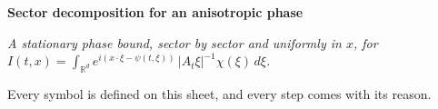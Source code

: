 \documentclass[10pt]{article}
\newcommand{\R}{\mathbb{R}}
\begin{document}
\begin{center}
{\fontsize{44}{52}\selectfont\bfseries\color{cNavy}Sector decomposition for an anisotropic phase\par}
\vspace{5mm}
{\LARGE\itshape\color{cGray}A stationary phase bound, sector by sector and uniformly in $x$, for
$\displaystyle I(t,x)=\int_{\R^d}e^{i(x\cdot\xi-\psi(t,\xi))}\,|A_t\xi|^{-1}\chi(\xi)\,d\xi$.\par
\vspace{1mm}
Every symbol is defined on this sheet, and every step comes with its reason.\par}
\end{center}
\vspace{6mm}

\noindent
\end{document}
